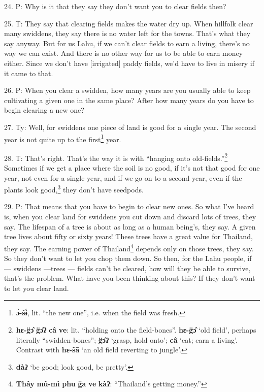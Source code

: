 24. P: Why is it that they say they don't want you to clear fields then?

25. T: They say that clearing fields makes the water dry up. When hillfolk clear
many swiddens, they say there is no water left for the towns. That's what they
say anyway. But for us Lahu, if we can't clear fields to earn a living, there's
no way we can exist. And there is no other way for us to be able to earn money
either. Since we don't have [irrigated] paddy fields, we'd have to live in misery
if it came to that.

26. P: When you clear a swidden, how many years are you usually able to keep cultivating
a given one in the same place? After how many years do you have to begin clearing
a new one?

27. Ty: Well, for swiddens one piece of land is good for a single year. The second
year is not quite up to the first\footnote{\textbf{ɔ̀-šɨ́}, lit. ``the new one'', i.e. when the field was fresh.} year.

28. T: That's right. That's the way it is with ``hanging onto old-fields.''\footnote{\textbf{hɛ-g̈ɔ̂} \textbf{g̈ɔ̂ʔ} \textbf{câ} \textbf{ve}: lit. ``holding onto the field-bones''. \textbf{hɛ-g̈ɔ̂} `old field', perhaps literally ``swidden-bones''; \textbf{g̈ɔ̂ʔ} `grasp, hold onto'; \textbf{câ} `eat; earn a living'. Contrast with \textbf{hɛ-šā} `an old field reverting to jungle'.}
Sometimes if we get a place where the soil is no good, if it's not that good for
one year, not even for a single year, and if we go on to a second year, even if
the plants look good,\footnote{\textbf{dàʔ} `be good; look good, be pretty'.} they don't have seedpods.

29. P: That means that you have to begin to clear new ones. So what I've heard
is, when you clear land for swiddens you cut down and discard lots of trees, they
say. The lifespan of a tree is about as long as a human being's, they say. A given
tree lives about fifty or sixty years! These trees have a great value for Thailand,
they say. The earning power of Thailand\footnote{\textbf{Thây} \textbf{mû-mì} \textbf{phu} \textbf{g̈a} \textbf{ve} \textbf{kàʔ}: ``Thailand's getting money.''} depends only on those trees, they say.
So they don't want to let you chop them down. So then, for the Lahu people, if
--- swiddens ---trees --- fields can't be cleared, how will they be able to survive,
that's the problem. What have you been thinking about this? If they don't want
to let you clear land.

